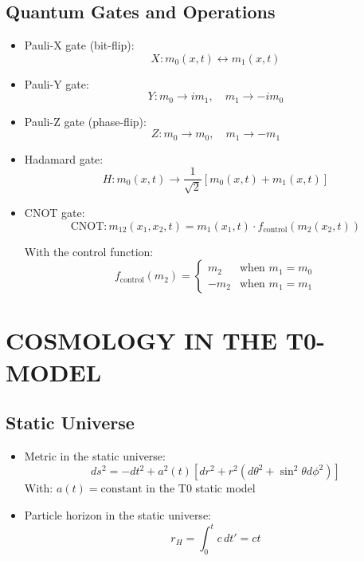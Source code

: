 \documentclass[12pt,a4paper]{article}
\begin{document}
	\subsection{Quantum Gates and Operations}
	\begin{itemize}
		\item Pauli-X gate (bit-flip):
		\begin{equation}
			X: m_0(x,t) \leftrightarrow m_1(x,t)
		\end{equation}
		
		\item Pauli-Y gate:
		\begin{equation}
			Y: m_0 \rightarrow im_1, \quad m_1 \rightarrow -im_0
		\end{equation}
		
		\item Pauli-Z gate (phase-flip):
		\begin{equation}
			Z: m_0 \rightarrow m_0, \quad m_1 \rightarrow -m_1
		\end{equation}
		
		\item Hadamard gate:
		\begin{equation}
			H: m_0(x,t) \rightarrow \frac{1}{\sqrt{2}}[m_0(x,t) + m_1(x,t)]
		\end{equation}
		
		\item CNOT gate:
		\begin{equation}
			\text{CNOT}: m_{12}(x_1,x_2,t) = m_1(x_1,t) \cdot f_{\text{control}}(m_2(x_2,t))
		\end{equation}
		
		With the control function:
		\begin{equation}
			f_{\text{control}}(m_2) = 
			\begin{cases}
				m_2 & \text{when } m_1 = m_0 \\
				-m_2 & \text{when } m_1 = m_1
			\end{cases}
		\end{equation}
	\end{itemize}
	
	\section{COSMOLOGY IN THE T0-MODEL}
	
	\subsection{Static Universe}
	\begin{itemize}
		\item Metric in the static universe:
		\begin{equation}
			ds^2 = -dt^2 + a^2(t)[dr^2 + r^2(d\theta^2 + \sin^2\theta d\phi^2)]
		\end{equation}
		With: $a(t) = \text{constant}$ in the T0 static model
		
		\item Particle horizon in the static universe:
		\begin{equation}
			r_H = \int_0^t c \, dt' = ct
		\end{equation}
	\end{itemize}
	
\end{document}
